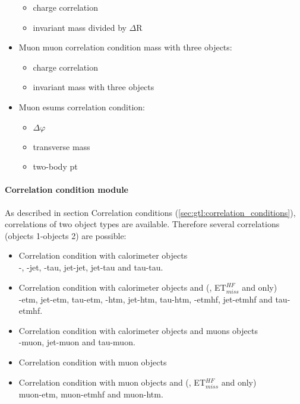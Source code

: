 \begin{itemize}
\begin{itemize}
\item charge correlation
\item invariant mass divided by $\Delta$R
\end{itemize}
\item Muon muon correlation condition mass with three objects:
\begin{itemize}
\item charge correlation
\item invariant mass with three objects
\end{itemize}
\item Muon esums correlation condition:
\begin{itemize}
\item $\Delta\varphi$
\item transverse mass
\item two-body pt
\end{itemize}
\end{itemize}

\paragraph{Correlation condition module}
\label{sec:gtl:correlation_condition_modules}

As described in section Correlation conditions (\ref{sec:gtl:correlation_conditions}), correlations of two object types are available. Therefore several correlations (objects 1-objects 2) are possible:
\begin{itemize}
\item Correlation condition with calorimeter objects\\
\egamma-\egamma, \egamma-jet, \egamma-tau, jet-jet, jet-tau and tau-tau.
\item Correlation condition with calorimeter objects and \esums (\etm, ET$_{miss}^{HF}$ and \htm only)\\
\egamma-etm, jet-etm, tau-etm, \egamma-htm, jet-htm, tau-htm, \egamma-etmhf, jet-etmhf and tau-etmhf.
\item Correlation condition with calorimeter objects and muons objects\\
\egamma-muon, jet-muon and tau-muon.
\item Correlation condition with muon objects\\
\item Correlation condition with muon objects and \esums (\etm, ET$_{miss}^{HF}$ and \htm only)\\
muon-etm, muon-etmhf and muon-htm.
\end{itemize}

